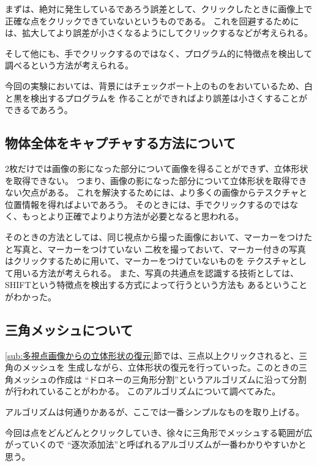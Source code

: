 \documentclass[11pt,a4j]{jsarticle}
\begin{document}
まずは、絶対に発生しているであろう誤差として、クリックしたときに画像上で正確な点をクリックできていないというものである。
これを回避するためには、拡大してより誤差が小さくなるようにしてクリックするなどが考えられる。

そして他にも、手でクリックするのではなく、プログラム的に特徴点を検出して調べるという方法が考えられる。

今回の実験においては、背景にはチェックボート上のものをおいているため、白と黒を検出するプログラムを
作ることができればより誤差は小さくすることができるであろう。

\subsection{物体全体をキャプチャする方法について}
\label{sub:物体全体をキャプチャする方法について}

2枚だけでは画像の影になった部分について画像を得ることができず、立体形状を取得できない。
つまり、画像の影になった部分について立体形状を取得できない欠点がある。
これを解決するためには、より多くの画像からテスクチャと位置情報を得ればよいであろう。
そのときには、手でクリックするのではなく、もっとより正確でよりより方法が必要となると思われる。

そのときの方法としては、同じ視点から撮った画像において、マーカーをつけたと写真と、マーカーをつけていない
二枚を撮っておいて、マーカー付きの写真はクリックするために用いて、マーカーをつけていないものを
テクスチャとして用いる方法が考えられる。
また、写真の共通点を認識する技術としては、SHIFTという特徴点を検出する方式によって行うという方法も
あるということがわかった。


\subsection{三角メッシュについて}
\label{sub:三角メッシュについて}
\ref{sub:多視点画像からの立体形状の復元}節では、三点以上クリックされると、三角のメッシュを
生成しながら、立体形状の復元を行っていった。このときの三角メッシュの作成は
``ドロネーの三角形分割''というアルゴリズムに沿って分割が行われていることがわかる。
このアルゴリズムについて調べてみた。

アルゴリズムは何通りかあるが、ここでは一番シンプルなものを取り上げる。

今回は点をどんどんとクリックしていき、徐々に三角形でメッシュする範囲が広がっていくので
``逐次添加法''と呼ばれるアルゴリズムが一番わかりやすいかと思う。
\end{document}
